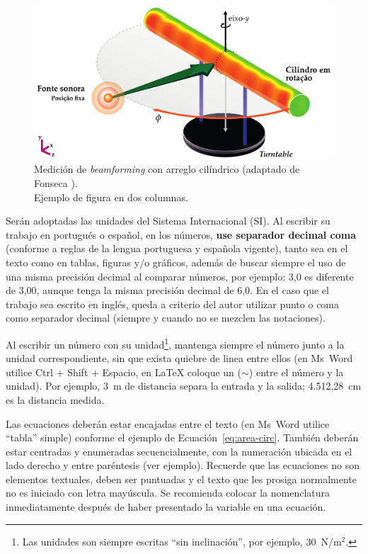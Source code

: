 \documentclass[12pt, a4paper, twoside, twocolumn]{article}
\begin{document}
\begin{figure}[!ht] %
	\centering
	\includegraphics[width=0.74\linewidth]{figs/Measurement-Scheme-Fonseca-2013.pdf}%
	\caption{Medición de \textit{beamforming} con arreglo cilíndrico (adaptado de Fonseca \cite{Fonseca-2013}).\\ Ejemplo de figura en dos columnas.}%
	\label{fig:beamforming}%
\end{figure}

Serán adoptadas las unidades del Sistema Internacional (SI). Al escribir su trabajo en portugués o español, en los números, \textbf{use separador decimal coma} (conforme a reglas de la lengua portuguesa y española vigente), tanto sea en el texto como en tablas, figuras y/o gráficos, además de buscar siempre el uso de una misma precisión decimal al comparar números, por ejemplo: 3,0 es diferente de 3,00, aunque tenga la misma precisión decimal de 6,0.
En el caso que el trabajo sea escrito en inglés, queda a criterio del autor utilizar punto o coma como separador decimal (siempre y cuando no se mezclen las notaciones).

Al escribir un número con su unidad\footnote{Las unidades son siempre escritas ``sin inclinación'', por ejemplo, 30~N/m$^2$.}, mantenga siempre el número junto a la unidad correspondiente, sin que exista quiebre de linea entre ellos (en Ms~Word utilice Ctrl + Shift + Espacio, en \LaTeX\xspace coloque un ($\sim$) entre el número y la unidad). Por ejemplo, 3~m de distancia separa la entrada y la salida;  4.512,28~cm es la distancia medida.

Las ecuaciones deberán estar encajadas entre el texto (en Ms~Word utilice ``tabla'' simple) conforme el ejemplo de Ecuación~\eqref{eq:area-circ}. También deberán estar centradas y enumeradas secuencialmente, con la numeración ubicada en el lado derecho y entre paréntesis (ver ejemplo). Recuerde que las ecuaciones no son elementos textuales, deben ser puntuadas y el texto que les prosiga normalmente no es iniciado con letra mayúscula. Se recomienda colocar la nomenclatura inmediatamente después de haber presentado la variable en una ecuación.
\end{document}

